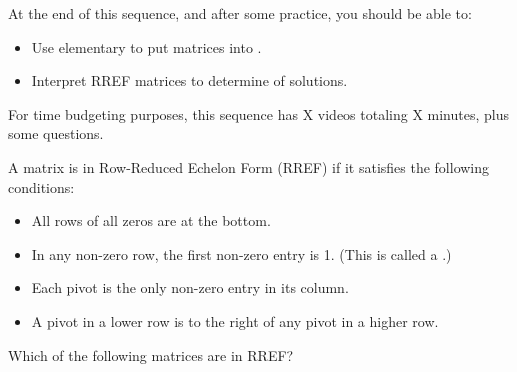 







At the end of this sequence, and after some practice, you should be able to:

\begin{itemize}
\item Use elementary {} to put matrices into {}.
\item Interpret RREF matrices to determine {} of solutions.  
\end{itemize}


For time budgeting purposes, this sequence has X videos totaling X minutes, 
plus some questions.  




\endedxtext

\endedxvertical






\endedxvertical





A matrix is in Row-Reduced Echelon Form (RREF) if it satisfies the following conditions:

\begin{itemize}
\item All rows of all zeros are at the bottom.
\item In any non-zero row, the first non-zero entry is 1.  (This is called a {}.) 
\item Each pivot is the only non-zero entry in its column.
\item A pivot in a lower row is to the right of any pivot in a higher row.  
\end{itemize}



\endedxtext



Which of the following matrices are in RREF?





